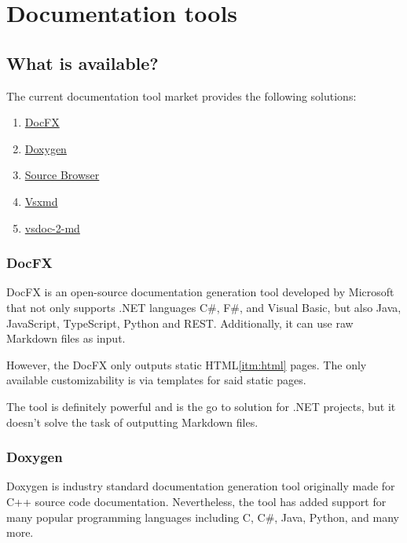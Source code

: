 \chapter{Documentation tools}
\section{What is available?}
The current documentation tool market provides the following solutions:

\begin{enumerate}
    \item \label{itm:firstTool} \href{https://github.com/dotnet/docfx}{DocFX}
    \item \label{itm:secondTool} \href{https://www.doxygen.nl/}{Doxygen}
    \item \label{itm:thirdTool} \href{https://github.com/KirillOsenkov/SourceBrowser}{Source Browser}
    \item \label{itm:fourthTool} \href{https://github.com/lijunle/Vsxmd}{Vsxmd}
    \item \label{itm:fifthTool} \href{https://github.com/discosultan/vsdoc-2-md}{vsdoc-2-md}
\end{enumerate}

\subsection{DocFX}

DocFX is an open-source documentation generation tool developed by Microsoft that not only supports .NET languages C\#, F\#, and Visual Basic, but also Java, JavaScript, TypeScript, Python and REST. Additionally, it can use raw Markdown files as input.

However, the DocFX only outputs static HTML\ref{itm:html} pages. The only available customizability is via templates for said static pages.

The tool is definitely powerful and is the go to solution for .NET projects, but it doesn't solve the task of outputting Markdown files.

\subsection{Doxygen}

Doxygen is industry standard documentation generation tool originally made for C++ source code documentation. Nevertheless, the tool has added support for many popular programming languages including C, C\#, Java, Python, and many more.


